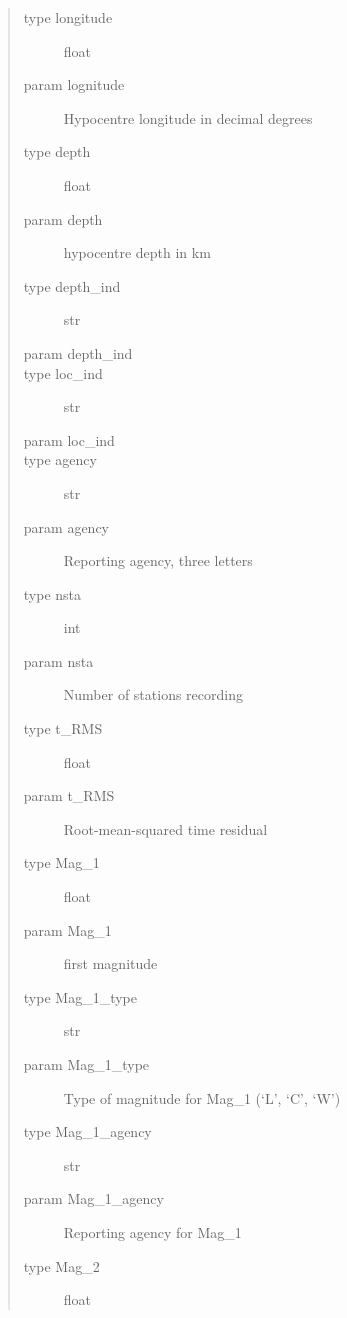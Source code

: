 \documentclass[a4paper,10pt,english]{sphinxmanual}
\begin{document}
\begin{fulllineitems}
\begin{description}
\begin{quote}
\begin{description}
\item[{type longitude}] \leavevmode
float

\item[{param lognitude}] \leavevmode
Hypocentre longitude in decimal degrees

\item[{type depth}] \leavevmode
float

\item[{param depth}] \leavevmode
hypocentre depth in km

\item[{type depth\_ind}] \leavevmode
str

\item[{param depth\_ind}] \leavevmode
\item[{type loc\_ind}] \leavevmode
str

\item[{param loc\_ind}] \leavevmode
\item[{type agency}] \leavevmode
str

\item[{param agency}] \leavevmode
Reporting agency, three letters

\item[{type nsta}] \leavevmode
int

\item[{param nsta}] \leavevmode
Number of stations recording

\item[{type t\_RMS}] \leavevmode
float

\item[{param t\_RMS}] \leavevmode
Root-mean-squared time residual

\item[{type Mag\_1}] \leavevmode
float

\item[{param Mag\_1}] \leavevmode
first magnitude

\item[{type Mag\_1\_type}] \leavevmode
str

\item[{param Mag\_1\_type}] \leavevmode
Type of magnitude for Mag\_1 (`L', `C', `W')

\item[{type Mag\_1\_agency}] \leavevmode
str

\item[{param Mag\_1\_agency}] \leavevmode
Reporting agency for Mag\_1

\item[{type Mag\_2}] \leavevmode
float


\end{description}
\end{quote}
\end{description}
\end{fulllineitems}
\end{document}
